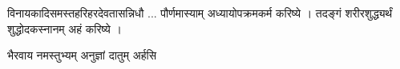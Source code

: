    विनायकादिसमस्तहरिहरदेवतासन्निधौ ... पौर्णमास्याम् अध्यायोपक्रमकर्म करिष्ये । 
    तदङ्गं शरीरशुद्ध्यर्थं शुद्धोदकस्नानम् अहं करिष्ये ।
    
     {भैरवाय नमस्तुभ्यम् अनुज्ञां दातुम् अर्हसि}

    




